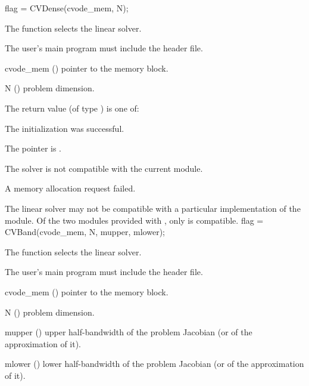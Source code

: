 {
  flag = CVDense(cvode\_mem, N);
}
{
  The function  selects the {\cvdense} linear solver. 

  The user's main program must include the  header file.
}
{
  \begin{args}
  \item[cvode\_mem] ()
    pointer to the {\cvodes} memory block.
  \item[N] ()
    problem dimension.
  \end{args}
}
{
  The return value  (of type ) is one of:
  \begin{args}
  \item[\Id{CVDENSE\_SUCCESS}] 
    The {\cvdense} initialization was successful.
  \item[\Id{CVDENSE\_MEM\_NULL}]
    The  pointer is .
  \item[\Id{CVDENSE\_ILL\_INPUT}]
    The {\cvdense} solver is not compatible with the current {\nvector} module.
  \item[\Id{CVDENSE\_MEM\_FAIL}]
    A memory allocation request failed.
  \end{args}
}
{
  The {\cvdense} linear solver may not be compatible with a particular
  implementation of the {\nvector} module. 
  Of the two {\nvector} modules provided with {\sundials}, only {\nvecs} is 
  compatible.
}
{
  flag = CVBand(cvode\_mem, N, mupper, mlower);
}
{
  The function  selects the {\cvband} linear solver. 

  The user's main program must include the  header file.
}
{
  \begin{args}
  \item[cvode\_mem] ()
    pointer to the {\cvodes} memory block.
  \item[N] ()
    problem dimension.
  \item[mupper] ()
    upper half-bandwidth of the problem Jacobian (or of the approximation of it).
  \item[mlower] ()
    lower half-bandwidth of the problem Jacobian (or of the approximation of it).
  \end{args}
}
